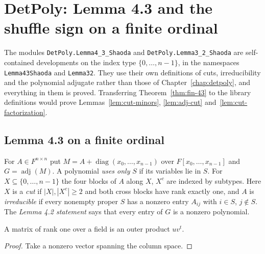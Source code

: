 \chapter{DetPoly: Lemma 4.3 and the shuffle sign on a finite ordinal}

The modules \texttt{DetPoly.Lemma4\_3\_Shaoda} and \texttt{DetPoly.Lemma3\_2\_Shaoda} are
self-contained developments on the index type $\{0,\dots,n-1\}$, in the namespaces
\texttt{Lemma43Shaoda} and \texttt{Lemma32}. They use their own definitions of cuts,
irreducibility and the polynomial adjugate rather than those of
Chapter~\ref{chap:detpoly}, and everything in them is proved. Transferring
Theorem~\ref{thm:fin-43} to the library definitions would prove
Lemmas~\ref{lem:cut-minors}, \ref{lem:adj-cut} and~\ref{lem:cut-factorization}.

\section{Lemma 4.3 on a finite ordinal}

\begin{definition}[Setup]
\label{def:fin-setup}
\leanok
For $A\in F^{n\times n}$ put $M=A+\operatorname{diag}(x_0,\dots,x_{n-1})$ over
$F[x_0,\dots,x_{n-1}]$ and $G=\operatorname{adj}(M)$. A polynomial \emph{uses only} $S$ if
its variables lie in $S$. For $X\subseteq\{0,\dots,n-1\}$ the four blocks of $A$ along
$X$, $X^c$ are indexed by subtypes. Here $X$ is a \emph{cut} if $|X|,|X^c|\ge2$ and both
cross blocks have rank exactly one, and $A$ is \emph{irreducible} if every nonempty proper
$S$ has a nonzero entry $A_{ij}$ with $i\in S$, $j\notin S$. The \emph{Lemma 4.2 statement}
says that every entry of $G$ is a nonzero polynomial.
\end{definition}

\begin{lemma}
\label{lem:fin-rank-one}
\leanok
A matrix of rank one over a field is an outer product $uv^t$.
\end{lemma}
\begin{proof}
\leanok
Take a nonzero vector spanning the column space.
\end{proof}

